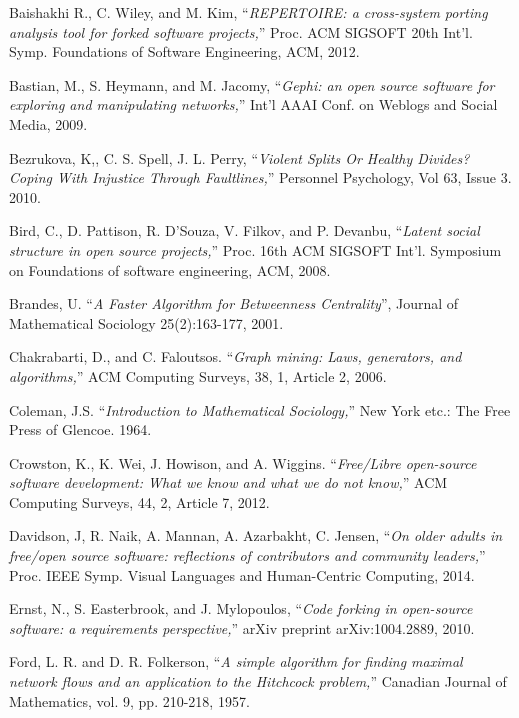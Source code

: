 \begin{thebibliography}{99.}
 Baishakhi R., C. Wiley, and M. Kim, ``\textit{REPERTOIRE: a cross-system porting analysis tool for forked software projects,}'' Proc. ACM SIGSOFT 20th Int'l. Symp. Foundations of Software Engineering, ACM, 2012.

 Bastian, M., S. Heymann, and M. Jacomy, ``\textit{Gephi: an open source software for exploring and manipulating networks,}'' Int'l AAAI Conf. on Weblogs and Social Media, 2009.

 Bezrukova, K,, C. S. Spell, J. L. Perry, ``\textit{Violent Splits Or Healthy Divides? Coping With Injustice Through Faultlines,}'' Personnel Psychology, Vol 63, Issue 3. 2010. 

 Bird, C., D. Pattison, R. D'Souza, V. Filkov, and P. Devanbu, ``\textit{Latent social structure in open source projects,}'' Proc. 16th ACM SIGSOFT Int'l. Symposium on Foundations of software engineering, ACM, 2008.  

 Brandes, U. ``\textit{A Faster Algorithm for Betweenness Centrality}'', Journal of Mathematical Sociology 25(2):163-177, 2001.

 Chakrabarti,  D., and C. Faloutsos. ``\textit{Graph mining: Laws, generators, and algorithms,}'' ACM Computing Surveys, 38, 1, Article 2, 2006.

 Coleman, J.S. ``\textit{Introduction to Mathematical Sociology,}'' New York etc.: The Free Press of Glencoe. 1964.

Crowston, K., K. Wei, J. Howison, and A. Wiggins. ``\textit{Free/Libre open-source software development: What we know and what we do not know,}'' ACM Computing Surveys, 44, 2, Article 7, 2012.

 Davidson, J, R. Naik, A. Mannan, A. Azarbakht, C. Jensen, ``\textit{On older adults in free/open source software: reflections of contributors and community leaders,}'' Proc. IEEE Symp. Visual Languages and Human-Centric Computing, 2014.

 Ernst, N., S. Easterbrook, and J. Mylopoulos, ``\textit{Code forking in open-source software: a requirements perspective,}'' arXiv preprint arXiv:1004.2889, 2010.

 Ford, L. R. and D. R. Folkerson, ``\textit{A simple algorithm for finding maximal network flows and an application to the Hitchcock problem,}'' Canadian Journal of Mathematics, vol. 9, pp. 210-218, 1957. 


\end{thebibliography}
